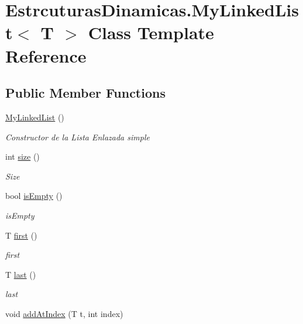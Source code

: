 \hypertarget{class_estrcuturas_dinamicas_1_1_my_linked_list}{}\section{Estrcuturas\+Dinamicas.\+My\+Linked\+List$<$ T $>$ Class Template Reference}
\label{class_estrcuturas_dinamicas_1_1_my_linked_list}
\subsection*{Public Member Functions}
\begin{DoxyCompactItemize}
\item 
\mbox{\hyperlink{class_estrcuturas_dinamicas_1_1_my_linked_list_a72b7dc72745511378a8847937c8325f6}{My\+Linked\+List}} ()
\begin{DoxyCompactList}\small\item\em Constructor de la Lista Enlazada simple \end{DoxyCompactList}\item 
int \mbox{\hyperlink{class_estrcuturas_dinamicas_1_1_my_linked_list_ab6d0ed3148cca6e0ab7d1d027d5bd5f3}{size}} ()
\begin{DoxyCompactList}\small\item\em Size \end{DoxyCompactList}\item 
bool \mbox{\hyperlink{class_estrcuturas_dinamicas_1_1_my_linked_list_a99fccf5f309b105f3671e0e89188c472}{is\+Empty}} ()
\begin{DoxyCompactList}\small\item\em is\+Empty \end{DoxyCompactList}\item 
T \mbox{\hyperlink{class_estrcuturas_dinamicas_1_1_my_linked_list_a6d0d64bd7ee90f7025204a70ac15394e}{first}} ()
\begin{DoxyCompactList}\small\item\em first \end{DoxyCompactList}\item 
T \mbox{\hyperlink{class_estrcuturas_dinamicas_1_1_my_linked_list_aa714154b072bdd50f780bb38244a7199}{last}} ()
\begin{DoxyCompactList}\small\item\em last \end{DoxyCompactList}\item 
void \mbox{\hyperlink{class_estrcuturas_dinamicas_1_1_my_linked_list_a4d9d6536ccbba5894b22bb3a4a757097}{add\+At\+Index}} (T t, int index)

\end{DoxyCompactItemize}

